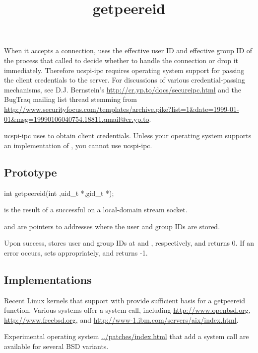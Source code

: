 \documentclass{book}
\title{getpeereid}
\begin{document}
\section{}

When it accepts a connection,  uses the effective user
ID and effective group ID of the process that called  to
decide whether to handle the connection or drop it immediately.
Therefore ucspi-ipc requires operating system support for passing the
client credentials to the server.  For discussions of various
credential-passing mechanisms, see D.J. Bernstein's
\href{Secure interprocess communication}{http://cr.yp.to/docs/secureipc.html}
and the BugTraq mailing list thread stemming from
\href{Wiping out setuid programs}{http://www.securityfocus.com/templates/archive.pike?list=1&date=1999-01-01&msg=19990106040754.18811.qmail@cr.yp.to}.

ucspi-ipc uses  to obtain client credentials.  Unless
your operating system supports an implementation of ,
you cannot use ucspi-ipc.

\subsection{Prototype}
\begin{code}%
  int getpeereid(int ,uid_t *,gid_t *);
\end{code}

 is the result of a successful  on a local-domain
stream socket.

 and  are pointers to addresses where the user and group
IDs are stored.

Upon success,  stores user and group IDs at 
and , respectively, and returns 0.  If an error occurs,
 sets  appropriately, and returns -1.


\subsection{Implementations}
Recent Linux kernels that support  with
 provide sufficient basis for a getpeereid function.
Various systems offer a  system call, including
\href{OpenBSD~3.0}{http://www.openbsd.org},
\href{FreeBSD~4.6}{http://www.freebsd.org}, and
\href{AIX~5L}{http://www-1.ibm.com/servers/aix/index.html}.

Experimental operating system \href{patches}{../patches/index.html}
that add a  system call are available for several BSD
variants.
\end{document}
